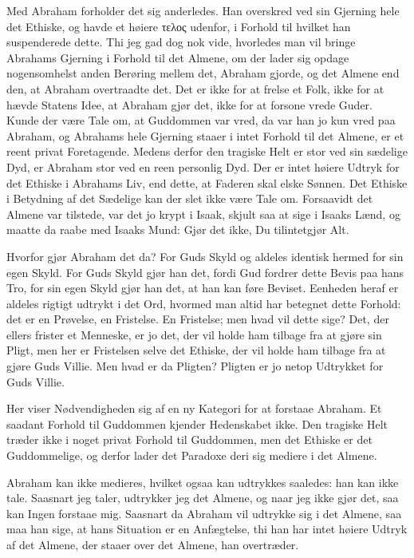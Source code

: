 \documentclass[12pt,a4paper]{article}
\begin{document}
Med Abraham forholder det sig anderledes. Han overskred ved sin Gjerning hele det Ethiske, og havde et høiere τελος udenfor, i Forhold til hvilket han suspenderede dette. Thi jeg gad dog nok vide, hvorledes man vil bringe Abrahams Gjerning i Forhold til det Almene, om der lader sig opdage nogensomhelst anden Berøring mellem det, Abraham gjorde, og det Almene end den, at Abraham overtraadte det. Det er ikke for at frelse et Folk, ikke for at hævde Statens Idee, at Abraham gjør det, ikke for at forsone vrede Guder. Kunde der være Tale om, at Guddommen var vred, da var han jo kun vred paa Abraham, og Abrahams hele Gjerning staaer i intet Forhold til det Almene, er et reent privat Foretagende. Medens derfor den tragiske Helt er stor ved sin sædelige Dyd, er Abraham stor ved en reen personlig Dyd. Der er intet høiere Udtryk for det Ethiske i Abrahams Liv, end dette, at Faderen skal elske Sønnen. Det Ethiske i Betydning af det Sædelige kan der slet ikke være Tale om. Forsaavidt det Almene var tilstede, var det jo krypt i Isaak, skjult saa at sige i Isaaks Lænd, og maatte da raabe med Isaaks Mund: Gjør det ikke, Du tilintetgjør Alt.

Hvorfor gjør Abraham det da? For Guds Skyld og aldeles identisk hermed for sin egen Skyld. For Guds Skyld gjør han det, fordi Gud fordrer dette Bevis paa hans Tro, for sin egen Skyld gjør han det, at han kan føre Beviset. Eenheden heraf er aldeles rigtigt udtrykt i det Ord, hvormed man altid har betegnet dette Forhold: det er en Prøvelse, en Fristelse. En Fristelse; men hvad vil dette sige? Det, der ellers frister et Menneske, er jo det, der vil holde ham tilbage fra at gjøre sin Pligt, men her er Fristelsen selve det Ethiske, der vil holde ham tilbage fra at gjøre Guds Villie. Men hvad er da Pligten? Pligten er jo netop Udtrykket for Guds Villie.

Her viser Nødvendigheden sig af en ny Kategori for at forstaae Abraham. Et saadant Forhold til Guddommen kjender Hedenskabet ikke. Den tragiske Helt træder ikke i noget privat Forhold til Guddommen, men det Ethiske er det Guddommelige, og derfor lader det Paradoxe deri sig mediere i det Almene.

Abraham kan ikke medieres, hvilket ogsaa kan udtrykkes saaledes: han kan ikke tale. Saasnart jeg taler, udtrykker jeg det Almene, og naar jeg ikke gjør det, saa kan Ingen forstaae mig. Saasnart da Abraham vil udtrykke sig i det Almene, saa maa han sige, at hans Situation er en Anfægtelse, thi han har intet høiere Udtryk af det Almene, der staaer over det Almene, han overtræder.
\end{document}
